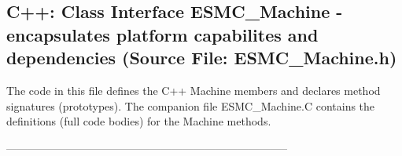  
\parskip        0pt
\parindent      0pt
\baselineskip  11pt
 
\def\bv{\begin{verbatim}}
\def\ev{\end{verbatim}}
\def\be{\begin{equation}}
\def\ee{\end{equation}}
\def\bea{\begin{eqnarray}}
\def\eea{\end{eqnarray}}
\def\bi{\begin{itemize}}
\def\ei{\end{itemize}}
\def\bn{\begin{enumerate}}
\def\en{\end{enumerate}}
\def\bd{\begin{description}}
\def\ed{\end{description}}
\def\({\left (}
\def\){\right )}
\def\[{\left [}
\def\]{\right ]}
\def\<{\left  \langle}
\def\>{\right \rangle}
\def\cI{{\cal I}}
\def\diag{\mathop{\rm diag}}
\def\tr{\mathop{\rm tr}}


 
\subsection{C++:  Class Interface ESMC\_Machine - encapsulates platform capabilites and dependencies (Source File: ESMC\_Machine.h)}


  
  
   The code in this file defines the C++ Machine members and declares method 
   signatures (prototypes).  The companion file ESMC\_Machine.C contains
   the definitions (full code bodies) for the Machine methods.
  
   
  
  -----------------------------------------------------------------------------
   
